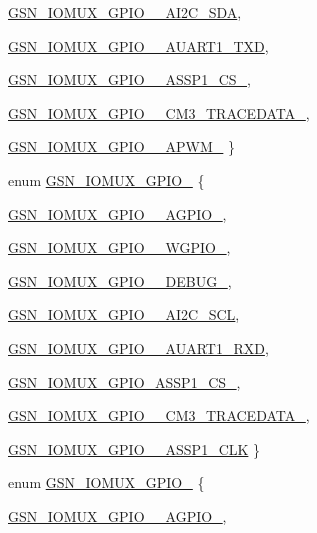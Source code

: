 \begin{DoxyCompactItemize}
\hyperlink{a00519_ab7d7b1750ad31046bc7faa198b81cbc8aadce92ea2def2e0ab9252a470dff085b}{GSN\_\-IOMUX\_\-GPIO\_\_\-AI2C\_\-SDA}, 
\par
\hyperlink{a00519_ab7d7b1750ad31046bc7faa198b81cbc8a33be0fa39750800d2d87a1626b420594}{GSN\_\-IOMUX\_\-GPIO\_\_\-AUART1\_\-TXD}, 
\par
\hyperlink{a00519_ab7d7b1750ad31046bc7faa198b81cbc8a8f3fb09f8a5d464f71c249c124c56f9e}{GSN\_\-IOMUX\_\-GPIO\_\_\-ASSP1\_\-CS\_}, 
\par
\hyperlink{a00519_ab7d7b1750ad31046bc7faa198b81cbc8a109c1e2816fad47da17b4257d3f4c441}{GSN\_\-IOMUX\_\-GPIO\_\_\-CM3\_\-TRACEDATA\_}, 
\par
\hyperlink{a00519_ab7d7b1750ad31046bc7faa198b81cbc8a9b4a72d728b0c35251a2ee7eff1abbb3}{GSN\_\-IOMUX\_\-GPIO\_\_\-APWM\_}
 \}
\item 
enum \hyperlink{a00519_a43a8cf0b2eb55e0ff26d2b455b20c9fe}{GSN\_\-IOMUX\_\-GPIO\_} \{ \par
\hyperlink{a00519_a43a8cf0b2eb55e0ff26d2b455b20c9fea44f55889fb8bd354a3266c9fea46a8fa}{GSN\_\-IOMUX\_\-GPIO\_\_\-AGPIO\_}, 
\par
\hyperlink{a00519_a43a8cf0b2eb55e0ff26d2b455b20c9feab183a452a8c1f7bcbecbc853c85929fb}{GSN\_\-IOMUX\_\-GPIO\_\_\-WGPIO\_}, 
\par
\hyperlink{a00519_a43a8cf0b2eb55e0ff26d2b455b20c9fea29bab50d576594e3a55f835bc275e8e8}{GSN\_\-IOMUX\_\-GPIO\_\_\-DEBUG\_}, 
\par
\hyperlink{a00519_a43a8cf0b2eb55e0ff26d2b455b20c9fea08667871deea015a164cbd21290179a9}{GSN\_\-IOMUX\_\-GPIO\_\_\-AI2C\_\-SCL}, 
\par
\hyperlink{a00519_a43a8cf0b2eb55e0ff26d2b455b20c9fea85174d7b6997dab5932cf3458e735d8c}{GSN\_\-IOMUX\_\-GPIO\_\_\-AUART1\_\-RXD}, 
\par
\hyperlink{a00519_a43a8cf0b2eb55e0ff26d2b455b20c9feaf93acd1504add4ae589076e5efe674d1}{GSN\_\-IOMUX\_\-GPIO\_\-ASSP1\_\-CS\_}, 
\par
\hyperlink{a00519_a43a8cf0b2eb55e0ff26d2b455b20c9feac3f373b935b5d2185099210b735e3b11}{GSN\_\-IOMUX\_\-GPIO\_\_\-CM3\_\-TRACEDATA\_}, 
\par
\hyperlink{a00519_a43a8cf0b2eb55e0ff26d2b455b20c9fea2020b3fa8f73d18ea959b1ea94130e18}{GSN\_\-IOMUX\_\-GPIO\_\_\-ASSP1\_\-CLK}
 \}
\item 
enum \hyperlink{a00519_a56c91a56c00dd218c4082263705bfb9c}{GSN\_\-IOMUX\_\-GPIO\_} \{ \par
\hyperlink{a00519_a56c91a56c00dd218c4082263705bfb9caa6dab18ac8a8a24b74984ca52c8b9997}{GSN\_\-IOMUX\_\-GPIO\_\_\-AGPIO\_}, 

\end{DoxyCompactItemize}
